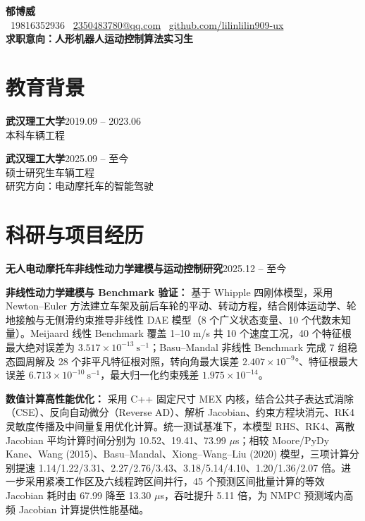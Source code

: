 \documentclass[10pt,a4paper]{article}
\newcommand{\cvsection}[2]{%
  \section{\texorpdfstring{\makebox[\widthof{#1}][c]{\color{CVBlue}#1}\hspace{0.35em}#2}{#2}}%
}
\newcommand{\projecttitle}[2]{%
  \textbf{#1}\hfill{\small\color{black!65}#2}\par\vspace{0.16em}%
}
\newcommand{\resumepara}[2]{%
  \noindent\textbf{#1：}#2\par\vspace{0.16em}%
}
\begin{document}
\small

\begin{center}
    {\LARGE\bfseries 郁博威}\\[0.22em]
    {\small
      \faPhone\ 19816352936
      \quad
      \faEnvelopeO\ \href{mailto:2350483780@qq.com}{2350483780@qq.com}
      \quad
      \faGithubSquare\ \href{https://github.com/lilinlilin909-ux}{github.com/lilinlilin909-ux}
    }\\[0.20em]
    {\normalsize\bfseries 求职意向：人形机器人运动控制算法实习生}
\end{center}

\cvsection{\faGraduationCap}{教育背景}

\textbf{武汉理工大学}\hfill 2019.09 -- 2023.06\\[-0.05em]
本科\quad 车辆工程

\vspace{0.12em}

\textbf{武汉理工大学}\hfill 2025.09 -- 至今\\[-0.05em]
硕士研究生\quad 车辆工程\\[-0.05em]
研究方向：电动摩托车的智能驾驶

\cvsection{\faUsers}{科研与项目经历}
\projecttitle{无人电动摩托车非线性动力学建模与运动控制研究}{2025.12 -- 至今}

\resumepara{非线性动力学建模与 Benchmark 验证}{
基于 Whipple 四刚体模型，采用 Newton--Euler 方法建立车架及前后车轮的平动、转动方程，结合刚体运动学、轮地接触与无侧滑约束推导非线性 DAE 模型（8 个广义状态变量、10 个代数未知量）。Meijaard 线性 Benchmark 覆盖 1--10 m/s 共 10 个速度工况，40 个特征根最大绝对误差为 $3.517\times10^{-13}\ \mathrm{s}^{-1}$；Basu--Mandal 非线性 Benchmark 完成 7 组稳态圆周解及 28 个非平凡特征根对照，转向角最大误差 $2.407\times10^{-9}$°、特征根最大误差 $6.713\times10^{-10}\ \mathrm{s}^{-1}$，最大归一化约束残差 $1.975\times10^{-14}$。
}

\resumepara{数值计算高性能优化}{
采用 C++ 固定尺寸 MEX 内核，结合公共子表达式消除（CSE）、反向自动微分（Reverse AD）、解析 Jacobian、约束方程块消元、RK4 灵敏度传播及中间量复用优化计算。统一测试基准下，本模型 RHS、RK4、离散 Jacobian 平均计算时间分别为 10.52、19.41、73.99 $\mu$s；相较 Moore/PyDy Kane、Wang (2015)、Basu--Mandal、Xiong--Wang--Liu (2020) 模型，三项计算分别提速 1.14/1.22/3.31、2.27/2.76/3.43、3.18/5.14/4.10、1.20/1.36/2.07 倍。进一步采用紧凑工作区及六线程跨区间并行，45 个预测区间批量计算的等效 Jacobian 耗时由 67.99 降至 13.30 $\mu$s，吞吐提升 5.11 倍，为 NMPC 预测域内高频 Jacobian 计算提供性能基础。
}
\end{document}

